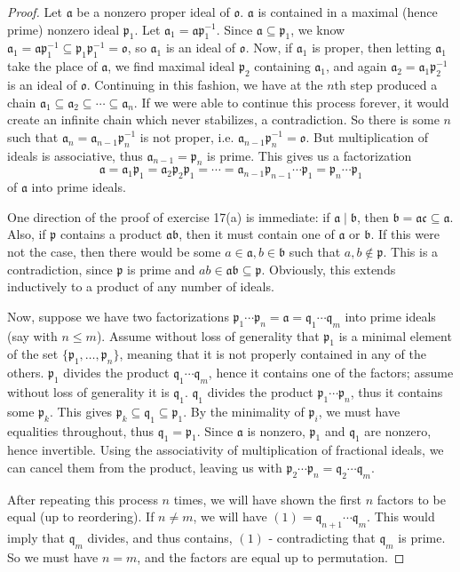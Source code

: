 \documentclass[10pt]{article}
\newcommand{\p}{\mathfrak{p}}
\newcommand{\q}{\mathfrak{q}}
\renewcommand{\a}{\mathfrak{a}}
\renewcommand{\b}{\mathfrak{b}}
\renewcommand{\c}{\mathfrak{c}}
\renewcommand{\o}{\mathfrak{o}}
\begin{document}
\begin{enumerate}
\begin{proof}
Let $\a$ be a nonzero proper ideal of $\o$.  $\a$ is contained in a maximal (hence prime) nonzero ideal $\p_1$.  Let $\a_1 = \a\p_1^{-1}$.  Since $\a \subseteq \p_1$, we know $\a_1 = \a\p_1^{-1} \subseteq \p_1\p_1^{-1} = \o$, so $\a_1$ is an ideal of $\o$.  Now, if $\a_1$ is proper, then letting $\a_1$ take the place of $\a$, we find maximal ideal $\p_2$ containing $\a_1$, and again $\a_2 = \a_1\p_2^{-1}$ is an ideal of $\o$.  Continuing in this fashion, we have at the $n$th step produced a chain $\a_1 \subseteq \a_2 \subseteq \cdots \subseteq \a_n$.  If we were able to continue this process forever, it would create an infinite chain which never stabilizes, a contradiction.  So there is some $n$ such that $\a_{n} = \a_{n-1}\p_{n}^{-1}$ is not proper, i.e. $\a_{n-1}\p_{n}^{-1} = \o$.  But multiplication of ideals is associative, thus $\a_{n-1} = \p_{n}$ is prime.  This gives us a factorization
$$
\a = \a_1\p_1 = \a_2\p_2\p_1 = \cdots = \a_{n-1}\p_{n-1} \cdots \p_1 = \p_n \cdots \p_1
$$
of $\a$ into prime ideals.

One direction of the proof of exercise 17(a) is immediate: if $\a \mid \b$, then $\b = \a\c \subseteq \a$.  Also, if $\p$ contains a product $\a\b$, then it must contain one of $\a$ or $\b$.  If this were not the case, then there would be some $a \in \a, b \in \b$ such that $a,b \not \in \p$.  This is a contradiction, since $\p$ is prime and $ab \in \a\b \subseteq \p$.  Obviously, this extends inductively to a product of any number of ideals.

Now, suppose we have two factorizations $\p_1 \cdots \p_n = \a = \q_1 \cdots \q_m$ into prime ideals (say with $n \leq m$).  Assume without loss of generality that $\p_1$ is a minimal element of the set $\{\p_1, \dots , \p_n\}$, meaning that it is not properly contained in any of the others.  $\p_1$ divides the product $\q_1 \cdots \q_m$, hence it contains one of the factors; assume without loss of generality it is $\q_1$.  $\q_1$ divides the product $\p_1 \cdots \p_n$, thus it contains some $\p_k$.  This gives $\p_k \subseteq \q_1 \subseteq \p_1$.  By the minimality of $\p_i$, we must have equalities throughout, thus $\q_1 = \p_1$.  Since $\a$ is nonzero, $\p_1$ and $\q_1$ are nonzero, hence invertible.  Using the associativity of multiplication of fractional ideals, we can cancel them from the product, leaving us with $\p_2 \cdots \p_n = \q_2 \cdots \q_m$.

After repeating this process $n$ times, we will have shown the first $n$ factors to be equal (up to reordering).  If $n \neq m$, we will have $(1) = \q_{n+1} \cdots \q_m$.  This would imply that $\q_m$ divides, and thus contains, $(1)$ - contradicting that $\q_m$ is prime.  So we must have $n = m$, and the factors are equal up to permutation.
\end{proof}


\end{enumerate}
\end{document}
